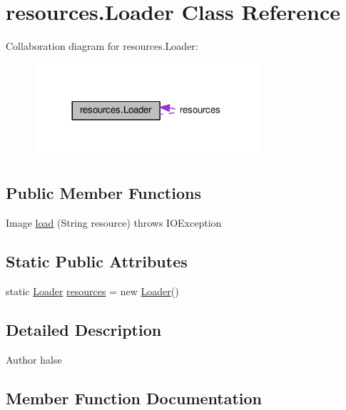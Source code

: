 \hypertarget{classresources_1_1Loader}{}\section{resources.\+Loader Class Reference}
\label{classresources_1_1Loader}


Collaboration diagram for resources.\+Loader\+:\nopagebreak
\begin{figure}[H]
\begin{center}
\leavevmode
\includegraphics[width=236pt]{classresources_1_1Loader__coll__graph}
\end{center}
\end{figure}
\subsection*{Public Member Functions}
\begin{DoxyCompactItemize}
\item 
Image \hyperlink{classresources_1_1Loader_ab70c0099b53e57b6ce64132291e4f29d}{load} (String resource)  throws I\+O\+Exception 
\end{DoxyCompactItemize}
\subsection*{Static Public Attributes}
\begin{DoxyCompactItemize}
\item 
static \hyperlink{classresources_1_1Loader}{Loader} \hyperlink{classresources_1_1Loader_a007cafedd048831f9d18ba4b8ac768ff}{resources} = new \hyperlink{classresources_1_1Loader}{Loader}()
\end{DoxyCompactItemize}


\subsection{Detailed Description}
\begin{DoxyAuthor}{Author}
halse 
\end{DoxyAuthor}


\subsection{Member Function Documentation}
